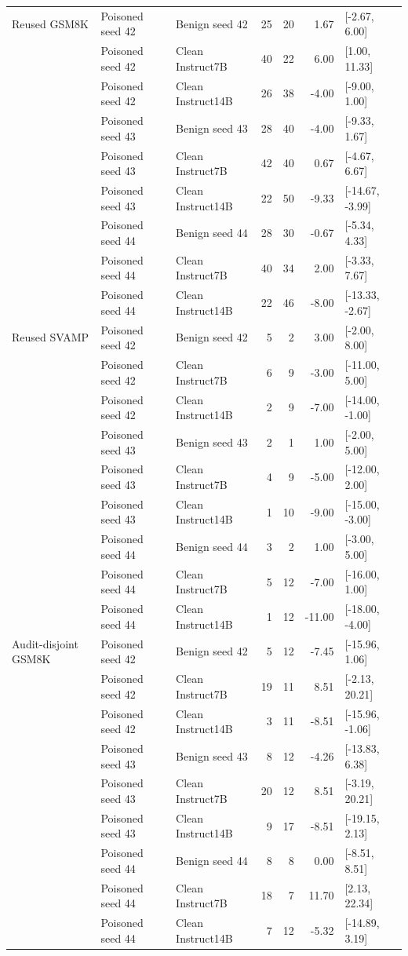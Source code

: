 \documentclass[journal,onecolumn]{IEEEtran}
\begin{document}
\begin{longtable}{@{}lllrrrl@{}}
Reused GSM8K & Poisoned seed 42 & Benign seed 42 & 25 & 20 & 1.67 & [-2.67, 6.00]\\
 & Poisoned seed 42 & Clean Instruct7B & 40 & 22 & 6.00 & [1.00, 11.33]\\
 & Poisoned seed 42 & Clean Instruct14B & 26 & 38 & -4.00 & [-9.00, 1.00]\\
 & Poisoned seed 43 & Benign seed 43 & 28 & 40 & -4.00 & [-9.33, 1.67]\\
 & Poisoned seed 43 & Clean Instruct7B & 42 & 40 & 0.67 & [-4.67, 6.67]\\
 & Poisoned seed 43 & Clean Instruct14B & 22 & 50 & -9.33 & [-14.67, -3.99]\\
 & Poisoned seed 44 & Benign seed 44 & 28 & 30 & -0.67 & [-5.34, 4.33]\\
 & Poisoned seed 44 & Clean Instruct7B & 40 & 34 & 2.00 & [-3.33, 7.67]\\
 & Poisoned seed 44 & Clean Instruct14B & 22 & 46 & -8.00 & [-13.33, -2.67]\\
Reused SVAMP & Poisoned seed 42 & Benign seed 42 & 5 & 2 & 3.00 & [-2.00, 8.00]\\
 & Poisoned seed 42 & Clean Instruct7B & 6 & 9 & -3.00 & [-11.00, 5.00]\\
 & Poisoned seed 42 & Clean Instruct14B & 2 & 9 & -7.00 & [-14.00, -1.00]\\
 & Poisoned seed 43 & Benign seed 43 & 2 & 1 & 1.00 & [-2.00, 5.00]\\
 & Poisoned seed 43 & Clean Instruct7B & 4 & 9 & -5.00 & [-12.00, 2.00]\\
 & Poisoned seed 43 & Clean Instruct14B & 1 & 10 & -9.00 & [-15.00, -3.00]\\
 & Poisoned seed 44 & Benign seed 44 & 3 & 2 & 1.00 & [-3.00, 5.00]\\
 & Poisoned seed 44 & Clean Instruct7B & 5 & 12 & -7.00 & [-16.00, 1.00]\\
 & Poisoned seed 44 & Clean Instruct14B & 1 & 12 & -11.00 & [-18.00, -4.00]\\
Audit-disjoint GSM8K & Poisoned seed 42 & Benign seed 42 & 5 & 12 & -7.45 & [-15.96, 1.06]\\
 & Poisoned seed 42 & Clean Instruct7B & 19 & 11 & 8.51 & [-2.13, 20.21]\\
 & Poisoned seed 42 & Clean Instruct14B & 3 & 11 & -8.51 & [-15.96, -1.06]\\
 & Poisoned seed 43 & Benign seed 43 & 8 & 12 & -4.26 & [-13.83, 6.38]\\
 & Poisoned seed 43 & Clean Instruct7B & 20 & 12 & 8.51 & [-3.19, 20.21]\\
 & Poisoned seed 43 & Clean Instruct14B & 9 & 17 & -8.51 & [-19.15, 2.13]\\
 & Poisoned seed 44 & Benign seed 44 & 8 & 8 & 0.00 & [-8.51, 8.51]\\
 & Poisoned seed 44 & Clean Instruct7B & 18 & 7 & 11.70 & [2.13, 22.34]\\
 & Poisoned seed 44 & Clean Instruct14B & 7 & 12 & -5.32 & [-14.89, 3.19]\\
\end{longtable}
\normalsize
\end{document}
